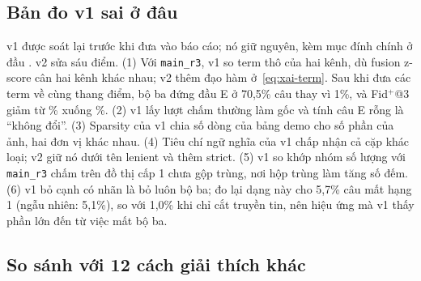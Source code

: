 \subsection{Bản đo v1 sai ở đâu}\label{sec:xai-v1v2}

v1 được soát lại trước khi đưa vào báo cáo; nó giữ nguyên, kèm mục đính chính ở đầu .
v2 sửa sáu điểm.
(1) Với \texttt{main\_r3}, v1 so term thô của hai kênh, dù fusion z-score cân hai kênh khác nhau; v2 thêm đạo hàm ở~\eqref{eq:xai-term}.
Sau khi đưa các term về cùng thang điểm, bộ ba đứng đầu E ở 70,5\% câu thay vì 1\%, và Fid$^{+}$@3 giảm từ \% xuống \%.
(2) v1 lấy lượt chấm thường làm gốc và tính câu E rỗng là ``không đổi''.
(3) Sparsity của v1 chia số dòng của bảng demo cho số phần của ảnh, hai đơn vị khác nhau.
(4) Tiêu chí ngữ nghĩa của v1 chấp nhận cả cặp khác loại; v2 giữ nó dưới tên lenient và thêm strict.
(5) v1 so khớp nhóm số lượng với \texttt{main\_r3} chấm trên đồ thị cấp 1 chưa gộp trùng, nơi hộp trùng làm tăng số đếm.
(6) v1 bỏ cạnh có nhãn là bỏ luôn bộ ba; đo lại dạng này cho 5,7\% câu mất hạng 1 (ngẫu nhiên: 5,1\%), so với 1,0\% khi chỉ cắt truyền tin, nên hiệu ứng mà v1 thấy phần lớn đến từ việc mất bộ ba.

\subsection{So sánh với 12 cách giải thích khác}\label{sec:xai-compare}

